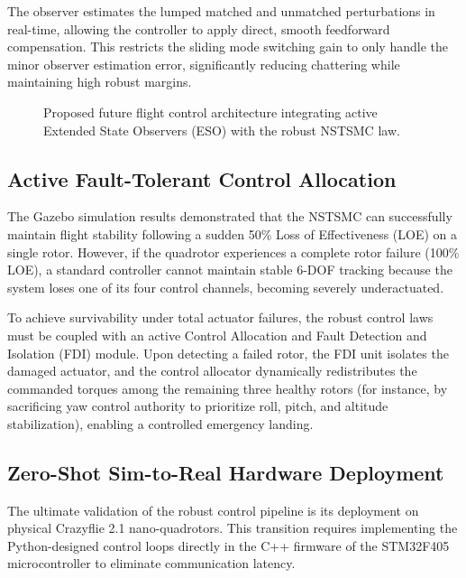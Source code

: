 The observer estimates the lumped matched and unmatched perturbations in real-time, allowing the controller to apply direct, smooth feedforward compensation. This restricts the sliding mode switching gain to only handle the minor observer estimation error, significantly reducing chattering while maintaining high robust margins.

\begin{figure}[h!]
\centering
{}
\caption{Proposed future flight control architecture integrating active Extended State Observers (ESO) with the robust NSTSMC law.}
\label{fig:future_observer_diagram}
\end{figure}

\subsection{Active Fault-Tolerant Control Allocation}
The Gazebo simulation results demonstrated that the NSTSMC can successfully maintain flight stability following a sudden 50\% Loss of Effectiveness (LOE) on a single rotor. However, if the quadrotor experiences a complete rotor failure (100\% LOE), a standard controller cannot maintain stable 6-DOF tracking because the system loses one of its four control channels, becoming severely underactuated.

To achieve survivability under total actuator failures, the robust control laws must be coupled with an active Control Allocation and Fault Detection and Isolation (FDI) module. Upon detecting a failed rotor, the FDI unit isolates the damaged actuator, and the control allocator dynamically redistributes the commanded torques among the remaining three healthy rotors (for instance, by sacrificing yaw control authority to prioritize roll, pitch, and altitude stabilization), enabling a controlled emergency landing.

\subsection{Zero-Shot Sim-to-Real Hardware Deployment}
The ultimate validation of the robust control pipeline is its deployment on physical Crazyflie 2.1 nano-quadrotors. This transition requires implementing the Python-designed control loops directly in the C++ firmware of the STM32F405 microcontroller to eliminate communication latency. 

